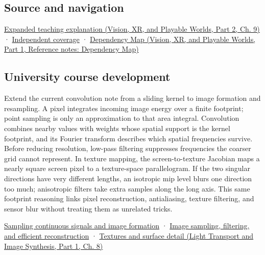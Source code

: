 \subsection{Source and navigation}\label{appendix-d5b3c692d9f0-source-and-navigation}

\hypertarget{appendix-d5b3c692d9f0-source-and-navigation}{}

\href{../07-Vision-XR-and-Playable-Worlds-P02/main.pdf\#04-visual-computing-ii-ch042-a-footprint-is-more-meaningful-than-an-isolated-pixel-center}{Expanded teaching explanation (Vision, XR, and Playable Worlds, Part 2, Ch. 9)} · \hyperref[appendix-fd090d982a15-xr01---independent-seeing-and-representation-source]{Independent coverage} · \href{../07-Vision-XR-and-Playable-Worlds-P01/main.pdf\#appendix-4ad47bdd269a}{Dependency Map (Vision, XR, and Playable Worlds, Part 1, Reference notes: Dependency Map)}

\subsection{University course development}\label{appendix-d5b3c692d9f0-university-course-development}

\hypertarget{appendix-d5b3c692d9f0-university-course-development}{}

Extend the current convolution note from a sliding kernel to image formation and resampling. A pixel integrates incoming image energy over a finite footprint; point sampling is only an approximation to that area integral. Convolution combines nearby values with weights whose spatial support is the kernel footprint, and its Fourier transform describes which spatial frequencies survive. Before reducing resolution, low-pass filtering suppresses frequencies the coarser grid cannot represent. In texture mapping, the screen-to-texture Jacobian maps a nearly square screen pixel to a texture-space parallelogram. If the two singular directions have very different lengths, an isotropic mip level blurs one direction too much; anisotropic filters take extra samples along the long axis. This same footprint reasoning links pixel reconstruction, antialiasing, texture filtering, and sensor blur without treating them as unrelated tricks.

\hyperref[03-visual-computing-i-ch003-sampling-continuous-signals-and-image-formation]{Sampling continuous signals and image formation} · \hyperref[03-visual-computing-i-ch004-image-sampling-filtering-and-efficient-reconstruction]{Image sampling, filtering, and efficient reconstruction} · \href{../04-Light-Transport-and-Image-Synthesis-P01/main.pdf\#03-visual-computing-i-ch019-textures-and-surface-detail}{Textures and surface detail (Light Transport and Image Synthesis, Part 1, Ch. 8)}
